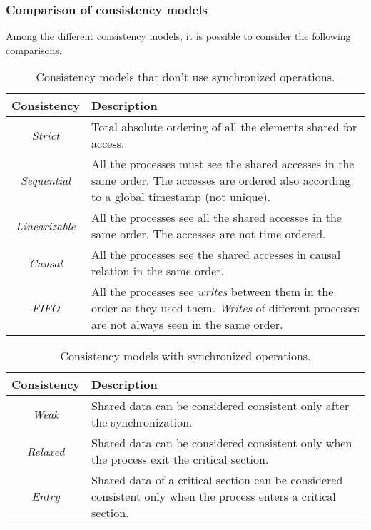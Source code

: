 \subsubsection{Comparison of consistency models}
Among the different consistency models, it is possible to consider the following comparisons.
\begin{table}[H]
	\centering
	\begin{tabular}{| c | p{12cm} |}
		\hline
		\textbf{Consistency} & \textbf{Description} \\ 
		\hline
		\textit{Strict} & Total absolute ordering of all the elements shared for access. \\
		\hline
		\textit{Sequential} & All the processes must see the shared accesses in the same order. The accesses are ordered also according to a global timestamp (not unique). \\
		\hline
		\textit{Linearizable} & All the processes see all the shared accesses in the same order. The accesses are not time ordered. \\
		\hline
		\textit{Causal} & All the processes see the shared accesses in causal relation in the same order.  \\
		\hline
		\textit{FIFO} & All the processes see \textit{writes} between them in the order as they used them. \textit{Writes} of different processes are not always seen in the same order. \\
		\hline
	\end{tabular}
	\caption{Consistency models that don't use synchronized operations.}
\end{table}
\begin{table}[H]
	\centering
	\begin{tabular}{| c | p{12cm} |}
		\hline
		\textbf{Consistency} & \textbf{Description} \\ 
		\hline
		\textit{Weak} & Shared data can be considered consistent only after the synchronization. \\
		\hline
		\textit{Relaxed} & Shared data can be considered consistent only when the process exit the critical section. \\
		\hline
		\textit{Entry} & Shared data of a critical section can be considered consistent only when the process enters a critical section. \\
		\hline
	\end{tabular}
	\caption{Consistency models with synchronized operations.}
\end{table}


